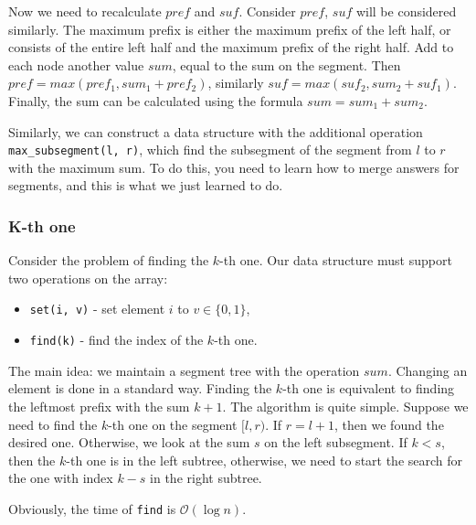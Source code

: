 \documentclass[11pt]{article}
\begin{document}
Now we need to recalculate \(pref\) and \(suf\). Consider \(pref\), \(suf\) will be considered
similarly. The maximum prefix is either the maximum prefix of the left half, or consists of the
entire left half and the maximum prefix of the right half. Add to each node another value \(sum\),
equal to the sum on the segment. Then \(pref = max(pref_1, sum_1 + pref_2)\), similarly \(suf =
    max(suf_2, sum_2 + suf_1)\). Finally, the sum can be calculated using the formula \(sum = sum_1 +
    sum_2\).

Similarly, we can construct a data structure with the additional operation \texttt{max\_subsegment(l,
    r)}, which find the subsegment of the segment from \(l\) to \(r\) with the maximum sum. To do this,
you need to learn how to merge answers for segments, and this is what we just learned to do.

\subsubsection{K-th one}
\label{sec:org17d1a39}
Consider the problem of finding the \(k\)-th one. Our data structure must support two operations
on the array:
\begin{itemize}
\item \texttt{set(i, v)} - set element \(i\) to \(v \in \{0, 1\}\),
\item \texttt{find(k)} - find the index of the \(k\)-th one.
\end{itemize}

The main idea: we maintain a segment tree with the operation \(sum\). Changing an element is done
in a standard way. Finding the \(k\)-th one is equivalent to finding the leftmost prefix with
the sum \(k + 1\). The algorithm is quite simple. Suppose we need to find the \(k\)-th one on the
segment \([l, r)\). If \(r = l + 1\), then we found the desired one. Otherwise, we look at the sum
\(s\) on the left subsegment. If \(k < s\), then the \(k\)-th one is in the left subtree, otherwise,
we need to start the search for the one with index \(k - s\) in the right subtree.

Obviously, the time of \texttt{find} is \(\mathcal{O}(\log n)\). \\
\end{document}
